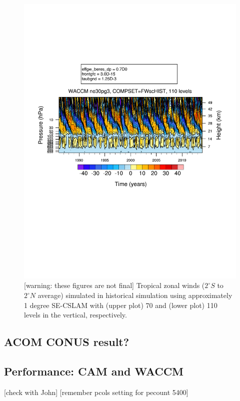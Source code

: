 \documentclass[draft]{agujournal2019}
\begin{document}
\begin{figure}
\noindent\includegraphics[width=\textwidth]{figs/FWscHIST-nlev110.pdf}
\caption{[warning: these figures are not final] Tropical zonal winds ($2^\circ S$ to $2^\circ N$ average) simulated in historical simulation using approximately 1 degree SE-CSLAM with (upper plot) 70 and (lower plot) 110  levels in the vertical, respectively.}
\end{figure}
\subsection{ACOM CONUS result?}
\subsection{Performance: CAM and WACCM}
[check with John] [remember pcols setting for pecount 5400]
\end{document}
